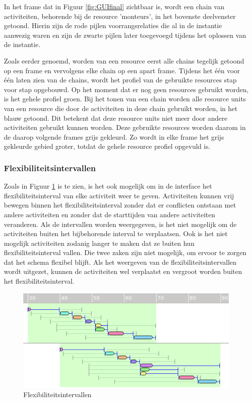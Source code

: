 In het frame dat in Figuur \ref{fig:GUIfinal} zichtbaar is, wordt een chain van activiteiten, behorende bij de resource 'monteurs', in het bovenste deelvenster getoond. Hierin zijn de rode pijlen voorrangsrelaties die al in de instantie aanwezig waren en zijn de zwarte pijlen later toegevoegd tijdens het oplossen van de instantie.

Zoals eerder genoemd, worden van een resource eerst alle chains tegelijk getoond op een frame en vervolgens elke chain op een apart frame. Tijdens het \'e\'en voor \'e\'en laten zien van de chains, wordt  het profiel van de gebruikte resources stap voor stap opgebouwd. Op het moment dat er nog geen resources gebruikt worden, is het gehele profiel groen. Bij het tonen van een chain worden alle resource units van een resource die door de activiteiten in deze chain gebruikt worden, in het blauw getoond. Dit betekent dat deze resource units niet meer door andere activiteiten gebruikt kunnen worden. Deze gebruikte resources worden daarom in de daarop volgende frames grijs gekleurd. Zo wordt in elke frame het grijs gekleurde gebied groter, totdat de gehele resource profiel opgevuld is.

\subsubsection{Flexibiliteitsintervallen}
Zoals in Figuur \ref{fig:flex-interval} is te zien, is het ook mogelijk om in de interface het flexibiliteitsinterval van elke activiteit weer te geven. Activiteiten kunnen vrij bewegen binnen het flexibiliteitsinterval zonder dat er conflicten ontstaan met andere activiteiten en zonder dat de starttijden van andere activiteiten veranderen. Als de intervallen worden weergegeven, is het niet mogelijk om de activiteiten buiten het bijbehorende interval te verplaatsen. Ook is het niet mogelijk activiteiten zodanig langer te maken dat ze buiten hun flexibiliteitsinterval vallen. Die twee zaken zijn niet mogelijk, om ervoor te zorgen dat het schema flexibel blijft. Als het weergeven van de flexibiliteitsintervallen wordt uitgezet, kunnen de activiteiten wel verplaatst en vergroot worden buiten het flexibiliteitsinterval.

\begin{figure}[H]
\center
\includegraphics[width=.7\textwidth]{../images/flex-interval.png}
\caption{Flexibiliteitsintervallen}
\label{fig:flex-interval}
\end{figure}

